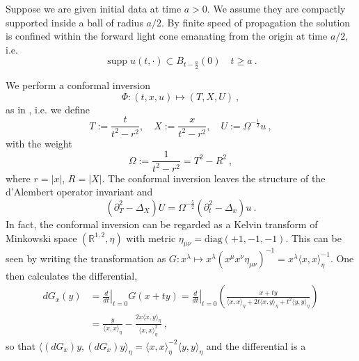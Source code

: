 \documentclass[a4paper]{amsart}
\providecommand{\abs}[1]{\lvert #1 \rvert}
\begin{document}
Suppose we are given initial data at time $a > 0$.
We assume they are compactly supported inside a ball of radius $a / 2$. By
finite speed of propagation
the solution is confined within the forward light cone emanating from the
origin at time $a / 2$, i.e.
\begin{equation*}
  \operatorname{supp} u(t,\cdot) \subset B_{t - \frac{a}{2}}(0) \quad t \geq a\ .
\end{equation*}
\par
We perform a conformal inversion 
\begin{equation*}
  \Phi:(t,x,u) \mapsto (T,X,U) \ ,
\end{equation*} as in \cite{MR1078267}, i.e. we define
\begin{equation*}
  T := \frac{t}{t^2 - r^2},\quad
  X := \frac{x}{t^2 - r^2},\quad
  U := \Omega^{-\frac{1}{2}} u \ ,
  \label{eq:conformalinversion}
\end{equation*}
with the weight
\begin{equation*}
  \Omega := \frac{1}{t^2 - r^2} = T^2 - R^2\ ,
\end{equation*}
where $r = \abs{x}$, $R = \abs{X}$.
The conformal inversion leaves the structure of the d'Alembert
operator invariant \cite[Lemma 4.2]{MR1262773} and
\begin{equation*}
  ({\partial}_T^2 - \Delta_X) U = \Omega^{-\frac{5}{2}} ({\partial}_t^2 - \Delta_x) u\ .
\end{equation*}
In fact, the conformal inversion can be regarded as a Kelvin transform of
Minkowski space $({\mathbb{R}}^{1,2},\eta)$ with metric $\eta_{\mu \nu} =
\mathrm{diag}(+1,-1,-1)$. This can be seen by writing the transformation as
$G: x^\lambda \mapsto x^\lambda (x^\mu x^\nu \eta_{\mu \nu})^{-1} =
x^\lambda \langle x, x \rangle^{-1}_\eta$. One then
calculates the differential,
\begin{equation*}
  \begin{split}
    dG_x(y)
    &=
    \left. \frac{d}{dt} \right\rvert_{t = 0} G(x + t y)
    =
    \left. \frac{d}{dt} \right\rvert_{t = 0}
    \left(
    \frac{x + t y}{\langle x, x \rangle_\eta + 2 t \langle x, y \rangle_\eta +
    t^2 \langle y, y \rangle_\eta}
    \right) \\
    &=
    \frac{y}{\langle x, x \rangle_\eta}
    -
    \frac{2 x \langle x, y \rangle_\eta}{\langle x, x \rangle^2_\eta} \ ,
  \end{split}
\end{equation*}
so that $\langle (dG_x) y, (dG_x) y \rangle_\eta = \langle x, x
\rangle_\eta^{-2} \langle y, y \rangle_\eta$ and the differential is a
\end{document}
